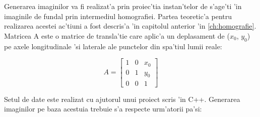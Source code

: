 \documentclass[12pt,a4paper,twoside]{report}
\begin{document}
Generarea imaginilor va fi realizat'a prin proiec'tia instan'telor de s'age'ti 'in imaginile de fundal prin intermediul homografiei. Partea teoretic'a pentru realizarea acestei ac'tiuni a fost descris'a 'in capitolul anterior 'in \ref{ch:homografie}. Matricea A este o matrice de transla'tie care aplic'a un deplasament de ($x_0$, $y_0$) pe axele longitudinale 'si laterale ale punctelor din spa'tiul lumii reale:

\begin{equation}
A
= \begin{bmatrix}
	1 & 0 & x_0 \\
	0 & 1 & y_0 \\
	0 & 0 & 1
	\end{bmatrix} 
\label{eq:8}
\end{equation}

Setul de date este realizat cu ajutorul unui proiect scris 'in C++. Generarea imaginilor pe baza acestuia trebuie s'a respecte urm'atorii pa'si:
\end{document}
